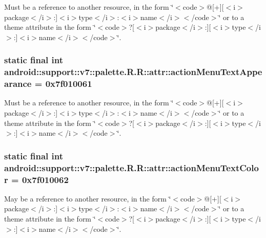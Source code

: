 Must be a reference to another resource, in the form \char`\"{}$<$code$>$@\mbox{[}+\mbox{]}\mbox{[}$<$i$>$package$<$/i$>$:\mbox{]}$<$i$>$type$<$/i$>$:$<$i$>$name$<$/i$>$$<$/code$>$\char`\"{} or to a theme attribute in the form \char`\"{}$<$code$>$?\mbox{[}$<$i$>$package$<$/i$>$:\mbox{]}\mbox{[}$<$i$>$type$<$/i$>$:\mbox{]}$<$i$>$name$<$/i$>$$<$/code$>$\char`\"{}. \hypertarget{classandroid_1_1support_1_1v7_1_1palette_1_1_r_1_1attr_71faea2acf1540c42d7fa557251349b8}{
\subsubsection[{actionMenuTextAppearance}]{\setlength{\rightskip}{0pt plus 5cm}static final int android::support::v7::palette.R.R::attr::actionMenuTextAppearance = 0x7f010061}}
\label{classandroid_1_1support_1_1v7_1_1palette_1_1_r_1_1attr_71faea2acf1540c42d7fa557251349b8}


Must be a reference to another resource, in the form \char`\"{}$<$code$>$@\mbox{[}+\mbox{]}\mbox{[}$<$i$>$package$<$/i$>$:\mbox{]}$<$i$>$type$<$/i$>$:$<$i$>$name$<$/i$>$$<$/code$>$\char`\"{} or to a theme attribute in the form \char`\"{}$<$code$>$?\mbox{[}$<$i$>$package$<$/i$>$:\mbox{]}\mbox{[}$<$i$>$type$<$/i$>$:\mbox{]}$<$i$>$name$<$/i$>$$<$/code$>$\char`\"{}. \hypertarget{classandroid_1_1support_1_1v7_1_1palette_1_1_r_1_1attr_733b60ff84f130a5e32da311067144fd}{
\subsubsection[{actionMenuTextColor}]{\setlength{\rightskip}{0pt plus 5cm}static final int android::support::v7::palette.R.R::attr::actionMenuTextColor = 0x7f010062}}
\label{classandroid_1_1support_1_1v7_1_1palette_1_1_r_1_1attr_733b60ff84f130a5e32da311067144fd}


May be a reference to another resource, in the form \char`\"{}$<$code$>$@\mbox{[}+\mbox{]}\mbox{[}$<$i$>$package$<$/i$>$:\mbox{]}$<$i$>$type$<$/i$>$:$<$i$>$name$<$/i$>$$<$/code$>$\char`\"{} or to a theme attribute in the form \char`\"{}$<$code$>$?\mbox{[}$<$i$>$package$<$/i$>$:\mbox{]}\mbox{[}$<$i$>$type$<$/i$>$:\mbox{]}$<$i$>$name$<$/i$>$$<$/code$>$\char`\"{}. 


